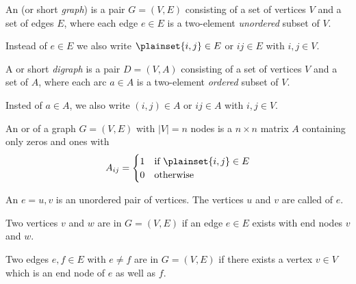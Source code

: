 \begin{lec}[2011-10-10]\end{lec}

\begin{defn}
  An  (or short \emph{graph}) is a pair $G=(V,E)$ consisting of a set of vertices $V$ and a set of edges $E$, where each edge $e \in E$ is a two-element \emph{unordered} subset of $V$.
  
  Instead of $e \in E$ we also write $\plainset{i,j} \in E$ or $ij \in E$ with $i,j \in V$.
\end{defn}

\begin{defn}
  A  or short \emph{digraph} is a pair $D=(V,A)$ consisting of a set of vertices $V$ and a set of  $A$, where each arc $a \in A$ is a two-element \emph{ordered} subset of $V$.
  
  Insted of $a \in A$, we also write $(i,j) \in A$ or $ij \in A$ with $i,j \in V$.
\end{defn}

\begin{defn}
  An  or  of a graph $G=(V,E)$ with $|V| = n$ nodes is a $n \times n$ matrix $A$ containing only zeros and ones with \[
  A_{ij}=\begin{cases} 1 & \text{if } \plainset{i,j} \in E \\
                0 & \text{otherwise} \end{cases}
  \]
\end{defn}

\begin{defn}
  An  $e = {u,v}$ is an unordered pair of vertices. The vertices $u$ and $v$ are called  of $e$.
\end{defn}

\begin{defn}
  Two vertices $v$ and $w$ are  in $G=(V,E)$ if an edge $e\in E$ exists with end nodes $v$ and $w$.
\end{defn}

\begin{defn}
  Two edges $e, f \in E$ with $e \neq f$ are  in $G = (V,E)$ if there exists a vertex $v \in V$ which is an end node of $e$ as well as $f$.
\end{defn}

